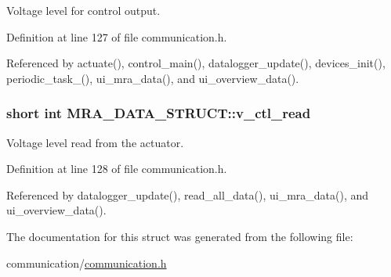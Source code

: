 Voltage level for control output. 



Definition at line 127 of file communication.\-h.



Referenced by actuate(), control\-\_\-main(), datalogger\-\_\-update(), devices\-\_\-init(), periodic\-\_\-task\-\_(), ui\-\_\-mra\-\_\-data(), and ui\-\_\-overview\-\_\-data().

\hypertarget{structMRA__DATA__STRUCT_a3a31d57268c33b21ac915fdc27dfe474}{
\subsubsection[{v\-\_\-ctl\-\_\-read}]{\setlength{\rightskip}{0pt plus 5cm}short int M\-R\-A\-\_\-\-D\-A\-T\-A\-\_\-\-S\-T\-R\-U\-C\-T\-::v\-\_\-ctl\-\_\-read}}\label{structMRA__DATA__STRUCT_a3a31d57268c33b21ac915fdc27dfe474}


Voltage level read from the actuator. 



Definition at line 128 of file communication.\-h.



Referenced by datalogger\-\_\-update(), read\-\_\-all\-\_\-data(), ui\-\_\-mra\-\_\-data(), and ui\-\_\-overview\-\_\-data().



The documentation for this struct was generated from the following file\-:\begin{DoxyCompactItemize}
\item 
communication/\hyperlink{communication_2communication_8h}{communication.\-h}\end{DoxyCompactItemize}
